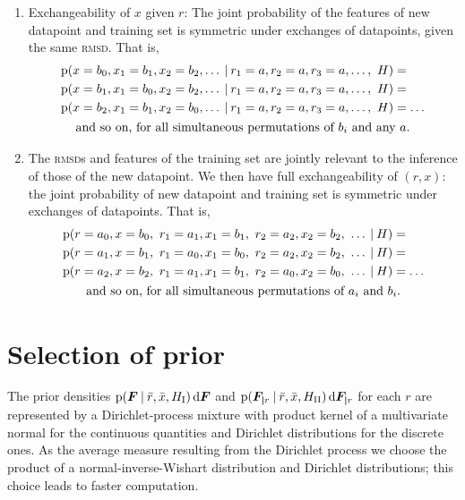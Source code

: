\documentclass[\ifafour a4paper,12pt,\else a5paper,10pt,\fi%
onecolumn,oneside,article,%
british%
]{memoir}
\theoremstyle{remark}
\theoremstyle{innote}
\newcommand*{\di}{\mathrm{d}}%
\newcommand*{\p}{\mathrm{p}}%
\renewcommand*{\|}[1][]{\nonscript\:#1\vert\nonscript\:\mathopen{}}
\renewcommand*{\=}{\TextOrMath\texteq\eq}
\newcommand*{\rmsd}{\textsc{rmsd}}
\newcommand*{\rd}{\bar{r}}
\newcommand*{\xd}{\bar{x}}
\newcommand*{\yF}{\bm{F}}
\newcommand*{\yFr}{\yF_{\bm{\mid}r}}
\begin{document}
\begin{enumerate}[label=\roman*.]
\item\label{item:exch_xr} Exchangeability of $x$ given $r$: The joint
  probability of the features of new datapoint and training set is symmetric
  under exchanges of datapoints, given the same \rmsd. That is,
  \begin{multline}
    \label{eq:p_exch_xr}
    \begin{aligned}
    &\p(x=b_{0}, x_{1}=b_{1}, x_{2}=b_{2}, \dotsc \|
    r_{1}=a, r_{2}=a, r_{3}=a, \dotsc,\ H) ={}\\
    &\p(x=b_{1}, x_{1}=b_{0}, x_{2}=b_{2}, \dotsc \|
    r_{1}=a, r_{2}=a, r_{3}=a, \dotsc,\ H) ={}\\
    &\p(x=b_{2}, x_{1}=b_{1}, x_{2}=b_{0}, \dotsc \|
    r_{1}=a, r_{2}=a, r_{3}=a, \dotsc,\ H) = \dotso
    \end{aligned} \\
    \text{and so on, for all simultaneous permutations of $b_{i}$ and any $a$.}
  \end{multline}
\item\label{item:exch_full} The \rmsd s and features of the training set
  are jointly relevant to the inference of those of the new datapoint. We
  then have full exchangeability of $(r,x)$: the joint probability of new
  datapoint and training set is symmetric under exchanges of datapoints.
  That is,
  \begin{multline}
    \label{eq:p_exch_full}
    \begin{aligned}
    &\p(r=a_{0}, x=b_{0},\ r_{1}=a_{1},x_{1}=b_{1}, \
    r_{2}=a_{2},x_{2}=b_{2}, \ \dotsc \| H) ={}\\
    &\p(r=a_{1}, x=b_{1},\ r_{1}=a_{0},x_{1}=b_{0}, \
    r_{2}=a_{2},x_{2}=b_{2}, \ \dotsc \| H) ={}\\
    &\p(r=a_{2}, x=b_{2},\ r_{1}=a_{1},x_{1}=b_{1}, \
      r_{2}=a_{0},x_{2}=b_{0}, \ \dotsc \| H) = \dotso
    \end{aligned} \\
    \text{and so on, for all simultaneous permutations of $a_{i}$ and $b_{i}$.}
  \end{multline}

\end{enumerate}



\section{Selection of prior}
\label{sec:sel_prior}

The prior densities $\p(\yF\| \rd, \xd, H_{\textrm{I}})\,\di\yF$ and
$\p(\yFr\| \rd, \xd, H_{\textrm{II}})\,\di\yFr$ for each $r$ are
represented by a Dirichlet-process mixture with product kernel of a
multivariate normal for the continuous quantities and Dirichlet
distributions for the discrete ones. As the average measure resulting from
the Dirichlet process we choose the product of a normal-inverse-Wishart
distribution and Dirichlet distributions; this choice leads to faster
computation.
\end{document}
